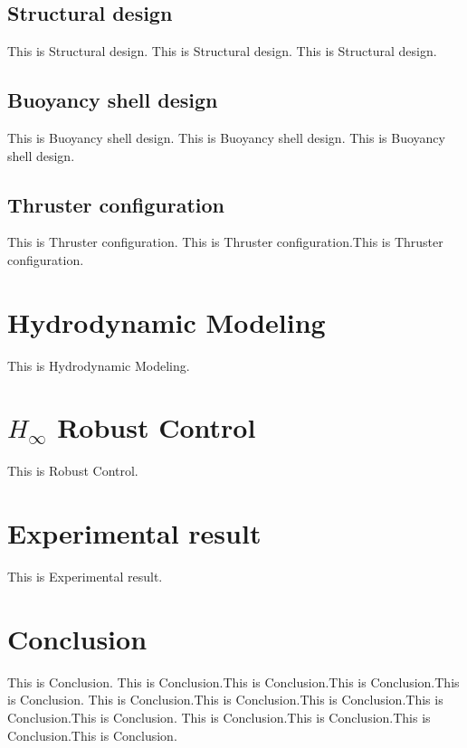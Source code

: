 \documentclass[a4paper,fleqn]{cas-dc}
\begin{document}
\subsection{Structural design}
This is Structural design. This is Structural design. This is Structural design. 

\subsection{Buoyancy shell design}
This is Buoyancy shell design. This is Buoyancy shell design. This is Buoyancy shell design. 

\subsection{Thruster configuration}
This is Thruster configuration. This is Thruster configuration.This is Thruster configuration.


\section{Hydrodynamic Modeling}
This is Hydrodynamic Modeling.

\section{\emph{$H_\infty$} Robust Control}
This is Robust Control.

\section{Experimental result}
This is Experimental result.

\section{Conclusion}
This is Conclusion. This is Conclusion.This is Conclusion.This is Conclusion.This is Conclusion.
This is Conclusion.This is Conclusion.This is Conclusion.This is Conclusion.This is Conclusion.
This is Conclusion.This is Conclusion.This is Conclusion.This is Conclusion.
\end{document}
